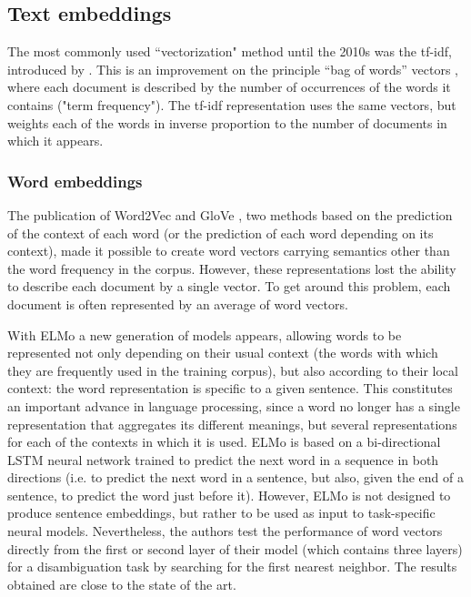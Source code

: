\subsection{Text embeddings}
\label{Text embeddings}
The most commonly used ``vectorization" method until the 2010s
was the tf-idf, introduced by \citet{sparck_1972_statistical}. This is an improvement on the principle “bag of words” vectors \citep{harris1954distributional}, where each document is described by the
number of occurrences of the words it contains ("term frequency"). The tf-idf representation uses the same vectors, but weights each of the words in inverse proportion to the number of documents in which it appears.

\subsubsection{Word embeddings}

The publication of Word2Vec \citep{mikolov_efficient_2013} and GloVe \citep{pennington2014glove}, two methods based on the prediction of the context of each word (or the prediction of each word depending on its context), made it possible to create word vectors carrying semantics other than the word frequency in the corpus. However, these representations lost the ability to describe each document by a single vector. To get around this problem, each document is often represented by an average of word vectors.

With ELMo \citep{peters2018deep} a new generation of models appears,
allowing words to be represented not only depending on their usual context (the words with which they are frequently used in the training corpus), but also according to their local context: the word representation is specific to a given sentence. This constitutes an important advance in language processing, since a word no longer has a single representation that aggregates its different meanings, but several representations for each of the contexts in which it is used. ELMo is based on a bi-directional LSTM neural network trained to predict the next word in a sequence in both directions (i.e. to predict the next word in a sentence, but also, given the end of a sentence, to predict the word just before it). However, ELMo is not designed to produce sentence embeddings, but rather to be used as input to task-specific neural models. Nevertheless, the authors test the performance of word vectors directly from the first or second layer of their model (which contains three layers) for a disambiguation task by searching for the first nearest neighbor. The results obtained are close to the state of the art.

